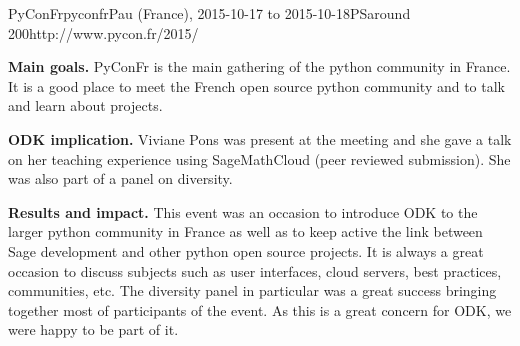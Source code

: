 \begin{event}{PyConFr}{pyconfr}{Pau (France), 2015-10-17 to 2015-10-18}{PS}{around 200}{http://www.pycon.fr/2015/}

\textbf{Main goals.} PyConFr is the main gathering of the python community in France. It is a good place to meet the 
French open source python community and to talk and learn about projects.

\textbf{ODK implication.} Viviane Pons was present at the meeting and she gave a talk
on her teaching experience using SageMathCloud \cite{15PonsSMC} (peer reviewed submission). She was
also part of a panel on diversity. 

\textbf{Results and impact.} This event was an occasion to introduce ODK to the larger python community in France as well as to
keep active the link between Sage development and other python open source projects. It is always a great occasion to discuss subjects
 such as user interfaces, cloud servers, best practices, communities, etc. The diversity panel in particular was a great success bringing
 together most of participants of the event. As this is a great concern for ODK, we were happy to be part of it.
\end{event}